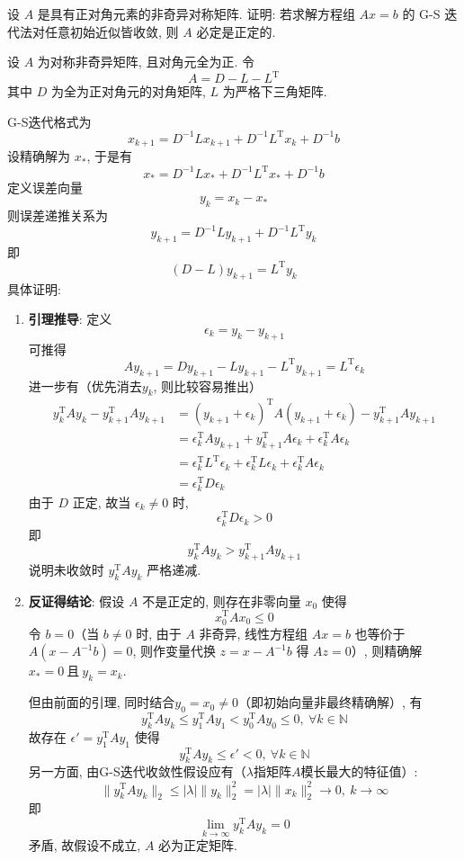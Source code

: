 \documentclass[12pt, answers]{exam}     %
\newcommand{\N}{\mathbb{N}}
\newcommand{\T}{\mathrm{T}}
\begin{document}
\begin{questions}
\question{}设 $A$ 是具有正对角元素的非奇异对称矩阵. 证明: 若求解方程组 $Ax = b$ 的 G-S 迭代法对任意初始近似皆收敛, 则 $A$ 必定是正定的. 

\begin{solution}
设 $A$ 为对称非奇异矩阵, 且对角元全为正. 令
\[
A = D - L - L^{\T}
\]
其中 $D$ 为全为正对角元的对角矩阵, $L$ 为严格下三角矩阵. 

G-S迭代格式为
\[
x_{k+1} = D^{-1}L x_{k+1} + D^{-1}L^{\T} x_k + D^{-1}b
\]
设精确解为 $x_*$, 于是有
\[
x_* = D^{-1}L x_* + D^{-1}L^{\T} x_* + D^{-1}b
\]
定义误差向量
\[
y_k = x_k - x_*
\]
则误差递推关系为
\[
y_{k+1} = D^{-1}L y_{k+1} + D^{-1}L^{\T} y_k
\]
即
\[
(D - L)y_{k+1} = L^{\T} y_k
\]
具体证明:
\begin{enumerate}
\item \textbf{引理推导}:
定义
\[
\epsilon_k = y_k - y_{k+1}
\]
可推得
\[
A y_{k+1} = D y_{k+1} - L y_{k+1} - L^{\T} y_{k+1}= L^{\T} \epsilon_k
\]
进一步有（优先消去$y_k$, 则比较容易推出）
\begin{align*}
y_k^{\T} A y_k - y_{k+1}^{\T} A y_{k+1} &= (y_{k+1} + \epsilon_k)^{\T} A (y_{k+1} + \epsilon_k) - y_{k+1}^{\T} A y_{k+1}  \\
&= \epsilon_k^{\T}A y_{k+1} + y_{k+1}^{\T}A \epsilon_k + \epsilon_k^{\T} A \epsilon_k \\
&= \epsilon_k^{\T} L^{\T} \epsilon_k + \epsilon_k^{\T} L \epsilon_k + \epsilon_k^{\T} A \epsilon_k \\
&= \epsilon_k^{\T} D \epsilon_k
\end{align*}
由于 $D$ 正定, 故当 $\epsilon_k \ne 0$ 时, 
\[
\epsilon_k^{\T} D \epsilon_k > 0
\]
即
\[
y_k^{\T} A y_k > y_{k+1}^{\T} A y_{k+1}
\]
说明未收敛时 $y_k^{\T} A y_k$ 严格递减. 
\item \textbf{反证得结论}: 假设 $A$ 不是正定的, 则存在非零向量 $x_0$ 使得
\[
x_0^{\T} A x_0 \leq 0
\]
令 $b = 0$（当 $b \neq 0$ 时, 由于 $A$ 非奇异, 线性方程组 $Ax = b$ 也等价于 $A(x - A^{-1}b) = 0$, 则作变量代换 $z = x - A^{-1}b$ 得 $Az = 0$）, 
则精确解 $x_* = 0 \ \text{且}\ y_k = x_k$. 

但由前面的引理, 同时结合$y_0 = x_0 \neq 0$（即初始向量非最终精确解）, 有
\[
y_k^{\T} A y_k \leq y_1^{\T} A y_1 < y_0^{\T} A y_0 \leq 0,\ \forall k \in \N
\]
故存在 $\epsilon' = y_1^{\T} A y_1 $ 使得
\[
y_k^{\T} A y_k \leq \epsilon' < 0,\ \forall k \in \N
\]
另一方面, 由G-S迭代收敛性假设应有（$\lambda$指矩阵$A$模长最大的特征值）:
\[
\| y_k^{\T} A y_k \|_2 \leq |\lambda| \| y_k \|_2^2 = |\lambda| \| x_k \|_2^2 \rightarrow 0,\ k \rightarrow \infty
\]
即
\[
\lim_{k \to \infty} y_k^{\T} A y_k = 0
\]
矛盾, 故假设不成立, $A$ 必为正定矩阵. 
\end{enumerate}
\end{solution}


\end{questions}
\end{document}
